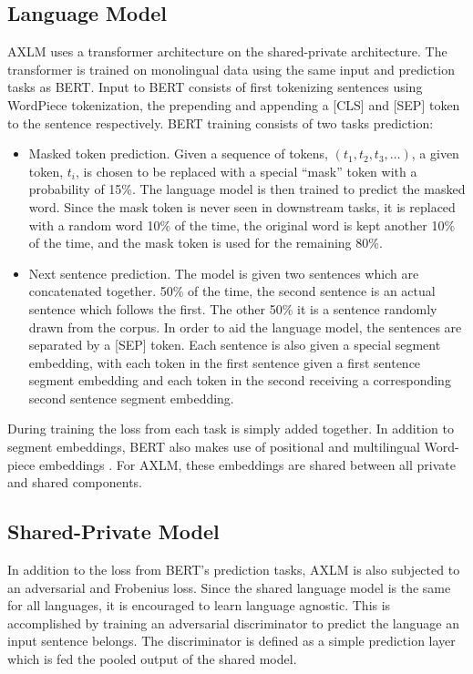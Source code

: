 \documentclass[10pt,letterpaper]{article}
\begin{document}
\begin{multicols}{2}

\subsection{Language Model}
AXLM uses a transformer architecture on the shared-private architecture.  The transformer is trained on monolingual data using the same input and prediction tasks as BERT.  Input to BERT consists of first tokenizing sentences using WordPiece tokenization, the prepending and appending a [CLS] and [SEP] token to the sentence respectively.  BERT training consists of two tasks prediction:

\begin{itemize}
	\item Masked token prediction.  Given a sequence of tokens, $(t_1, t_2, t_3, \dots)$, a given token, $t_i$, is chosen to be replaced with a special ``mask'' token with a probability of 15\%.  The language model is then trained to predict the masked word.  Since the mask token is never seen in downstream tasks, it is replaced with a random word 10\% of the time, the original word is kept another 10\% of the time, and the mask token is used for the remaining 80\%.

	\item Next sentence prediction.  The model is given two sentences which are concatenated together.  50\% of the time, the second sentence is an actual sentence which follows the first.  The other 50\% it is a sentence randomly drawn from the corpus.  In order to aid the language model, the sentences are separated by a [SEP] token.  Each sentence is also given a special segment embedding, with each token in the first sentence given a first sentence segment embedding and each token in the second receiving a corresponding second sentence segment embedding.
\end{itemize}

During training the loss from each task is simply added together.  In addition to segment embeddings, BERT also makes use of positional and multilingual Word-piece embeddings \cite{}.  For AXLM, these embeddings are shared between all private and shared components.


\subsection{Shared-Private Model}
In addition to the loss from BERT's prediction tasks, AXLM is also subjected to an adversarial and Frobenius loss.  Since the shared language model is the same for all languages, it is encouraged to learn language agnostic.  This is accomplished by training an adversarial discriminator to predict the language an input sentence belongs.  The discriminator is defined as a simple prediction layer which is fed the pooled output of the shared model.


\end{multicols}
\end{document}
